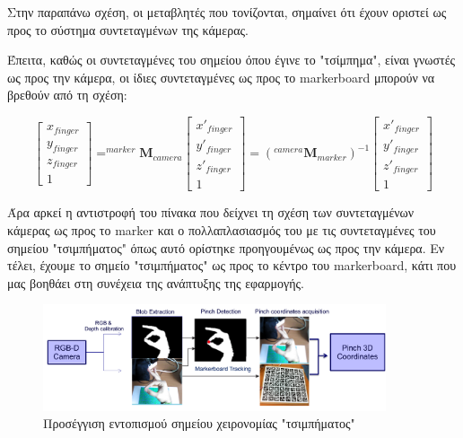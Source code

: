 Στην παραπάνω σχέση, οι μεταβλητές που τονίζονται, σημαίνει ότι έχουν οριστεί ως προς το σύστημα συντεταγμένων της κάμερας.

Έπειτα, καθώς οι συντεταγμένες του σημείου όπου έγινε το "τσίμπημα", είναι γνωστές ως προς την κάμερα, οι ίδιες συντεταγμένες ως προς το markerboard μπορούν να βρεθούν από τη σχέση:


\begin{equation}
\begin{bmatrix}
x_{finger} \\ y_{finger} \\ z_{finger} \\ 1
\end{bmatrix}
=
^{marker}\mathbf{M}_{camera}
\begin{bmatrix}
x'_{finger} \\ y'_{finger} \\ z'_{finger} \\ 1
\end{bmatrix}
=
(^{camera}\mathbf{M}_{marker})^{-1}
\begin{bmatrix}
x'_{finger} \\ y'_{finger} \\ z'_{finger} \\ 1
\end{bmatrix}
\end{equation}


Άρα αρκεί η αντιστροφή του πίνακα που δείχνει τη σχέση των συντεταγμένων κάμερας ως προς το marker και ο πολλαπλασιασμός του με τις συντεταγμένες του σημείου "τσιμπήματος" όπως αυτό ορίστηκε προηγουμένως ως προς την κάμερα. Εν τέλει, έχουμε το σημείο "τσιμπήματος" ως προς το κέντρο του markerboard, κάτι που μας βοηθάει στη συνέχεια της ανάπτυξης της εφαρμογής.


\begin{figure}[H]
    \centering
    \includegraphics[width=0.9\textwidth]{Files/Figures/procedure.pdf}
    \caption[Προσέγγιση εντοπισμού σημείου χειρονομίας "τσιμπήματος" ]{Προσέγγιση εντοπισμού σημείου χειρονομίας "τσιμπήματος"}
    \label{fig:procedure}
\end{figure}



